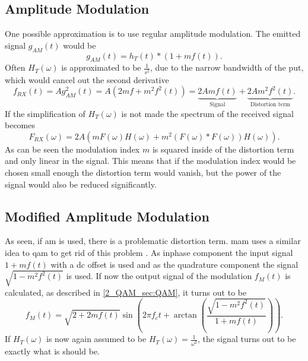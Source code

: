 \subsection{Amplitude Modulation}
One possible approximation is to use regular amplitude modulation. The emitted signal $g_{AM}(t)$ would be 
\begin{equation}
    g_{AM}(t) = h_T(t) * (1 + mf(t)).
\end{equation}
Often $H_T(\omega)$ is approximated to be $\frac{1}{s^2}$, due to the narrow bandwidth of the \acrshort{put}, which would cancel out the second derivative
\begin{equation}
    f_{RX}(t) 
    = 
    Ag^2_{AM}(t) 
    =
    A(2mf + m^2f^2(t))
    =
   \underbrace{2Amf(t)}_{\text{Signal}} + \underbrace{2Am^2f^2(t)}_{\text{Distortion term}}.
\end{equation}
If the simplification of $H_T(\omega)$ is not made the spectrum of the received signal becomes
\begin{equation}
    F_{RX}(\omega) = 2A(mF(\omega)H(\omega) + m^2(F(\omega)*F(\omega))H(\omega)).
\end{equation}
As can be seen the modulation index $m$ is squared inside of the distortion term and only linear in the signal. This means that if the modulation index would be chosen small enough the distortion term would vanish, but the power of the signal would also be reduced significantly. 
\subsection{Modified Amplitude Modulation}
As seen, if \acrshort{am} is used, there is a problematic distortion term. \acrfull{mam} uses a similar idea to \acrfull{qam} to get rid of this problem \cite{MAM_Main_Paper} .
As inphase component the input signal $1 + mf(t)$ with a \acrshort{dc} offset is used and as the quadrature component the signal $\sqrt{1 - m^2f^2(t)}$ is used. If now the output signal of the modulation $f_M(t)$ is calculated, as described in \ref{2_QAM_sec:QAM}, it turns out to be
\begin{equation}
    f_M(t) = \sqrt{2 + 2mf(t)} \sin{\left(2 \pi f_c t + \arctan{ \left ( \frac{\sqrt{1 - m^2f^2(t)}}{1 + mf(t)} \right )} \right )}.
\end{equation}
If $H_T(\omega)$ is now again assumed to be $H_T(\omega) = \frac{1}{\omega^2}$, the signal turns out to be exactly what is should be. 

